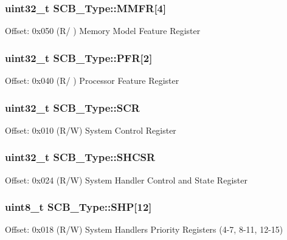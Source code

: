 \subsubsection[{\texorpdfstring{M\+M\+FR}{MMFR}}]{ uint32\+\_\+t S\+C\+B\+\_\+\+Type\+::\+M\+M\+FR\mbox{[}4\mbox{]}}\hypertarget{struct_s_c_b___type_aec2f8283d2737c6897188568a4214976}{}\label{struct_s_c_b___type_aec2f8283d2737c6897188568a4214976}
Offset\+: 0x050 (R/ ) Memory Model Feature Register 
\subsubsection[{\texorpdfstring{P\+FR}{PFR}}]{ uint32\+\_\+t S\+C\+B\+\_\+\+Type\+::\+P\+FR\mbox{[}2\mbox{]}}\hypertarget{struct_s_c_b___type_a3f51c43f952f3799951d0c54e76b0cb7}{}\label{struct_s_c_b___type_a3f51c43f952f3799951d0c54e76b0cb7}
Offset\+: 0x040 (R/ ) Processor Feature Register 
\subsubsection[{\texorpdfstring{S\+CR}{SCR}}]{ uint32\+\_\+t S\+C\+B\+\_\+\+Type\+::\+S\+CR}\hypertarget{struct_s_c_b___type_abfad14e7b4534d73d329819625d77a16}{}\label{struct_s_c_b___type_abfad14e7b4534d73d329819625d77a16}
Offset\+: 0x010 (R/W) System Control Register 
\subsubsection[{\texorpdfstring{S\+H\+C\+SR}{SHCSR}}]{ uint32\+\_\+t S\+C\+B\+\_\+\+Type\+::\+S\+H\+C\+SR}\hypertarget{struct_s_c_b___type_ae9891a59abbe51b0b2067ca507ca212f}{}\label{struct_s_c_b___type_ae9891a59abbe51b0b2067ca507ca212f}
Offset\+: 0x024 (R/W) System Handler Control and State Register 
\subsubsection[{\texorpdfstring{S\+HP}{SHP}}]{ uint8\+\_\+t S\+C\+B\+\_\+\+Type\+::\+S\+HP\mbox{[}12\mbox{]}}\hypertarget{struct_s_c_b___type_af6336103f8be0cab29de51daed5a65f4}{}\label{struct_s_c_b___type_af6336103f8be0cab29de51daed5a65f4}
Offset\+: 0x018 (R/W) System Handlers Priority Registers (4-\/7, 8-\/11, 12-\/15) 
